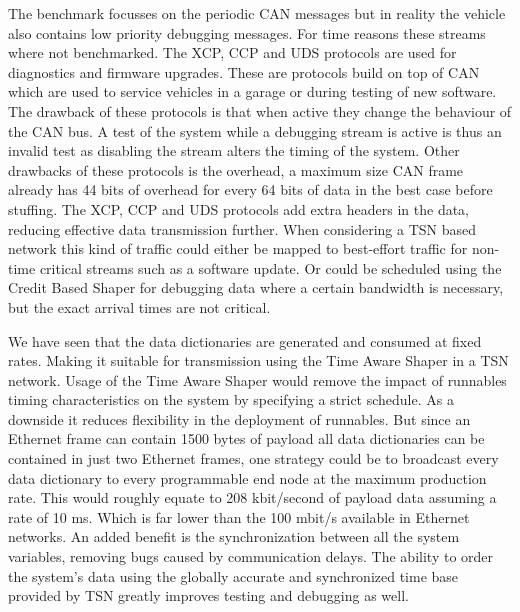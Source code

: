 The benchmark focusses on the periodic CAN messages but in reality the vehicle also contains low priority debugging messages. For time reasons these streams where not benchmarked. The XCP, CCP and UDS protocols are used for diagnostics and firmware upgrades. These are protocols build on top of CAN which are used to service vehicles in a garage or during testing of new software. The drawback of these protocols is that when active they change the behaviour of the CAN bus. A test of the system while a debugging stream is active is thus an invalid test as disabling the stream alters the timing of the system. Other drawbacks of these protocols is the overhead, a maximum size CAN frame already has 44 bits of overhead for every 64 bits of data in the best case before stuffing. The XCP, CCP and UDS protocols add extra headers in the data, reducing effective data transmission further. When considering a TSN based network this kind of traffic could either be mapped to best-effort traffic for non-time critical streams such as a software update. Or could be scheduled using the Credit Based Shaper for debugging data where a certain bandwidth is necessary, but the exact arrival times are not critical.

We have seen that the data dictionaries are generated and consumed at fixed rates. Making it suitable for transmission using the Time Aware Shaper in a TSN network. Usage of the Time Aware Shaper would remove the impact of runnables timing characteristics on the system by specifying a strict schedule. As a downside it reduces flexibility in the deployment of runnables. But since an Ethernet frame can contain 1500 bytes of payload all data dictionaries can be contained in just two Ethernet frames, one strategy could be to broadcast every data dictionary to every programmable end node at the maximum production rate. This would roughly equate to 208 kbit/second of payload data assuming a rate of 10 ms. Which is far lower than the 100 mbit/s available in Ethernet networks. An added benefit is the synchronization between all the system variables, removing bugs caused by communication delays. The ability to order the system's data using the globally accurate and synchronized time base provided by TSN greatly improves testing and debugging as well.

